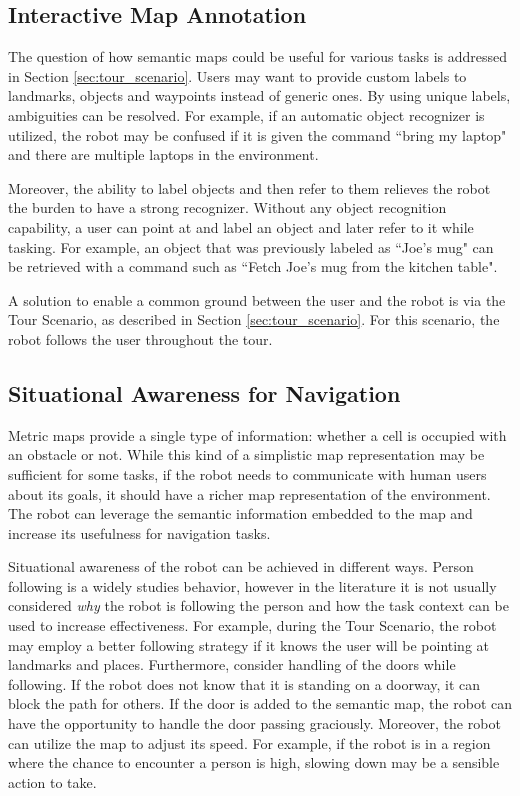 \documentclass[12pt]{gatech-thesis}
\begin{document}
\subsection{Interactive Map Annotation}

The question of how semantic maps could be useful for various tasks is addressed in Section \ref{sec:tour_scenario}. Users may want to provide custom labels to landmarks, objects and waypoints instead of generic ones. By using unique labels, ambiguities can be resolved. For example, if an automatic object recognizer is utilized, the robot may be confused if it is given the command ``bring my laptop" and there are multiple laptops in the environment.

Moreover, the ability to label objects and then refer to them relieves the robot the burden to have a strong recognizer. Without any object recognition capability, a user can point at and label an object and later refer to it while tasking. For example, an object that was previously labeled as ``Joe's mug" can be retrieved with a command such as ``Fetch Joe's mug from the kitchen table".

A solution to enable a common ground between the user and the robot is via the Tour Scenario, as described in Section \ref{sec:tour_scenario}. For this scenario, the robot follows the user throughout the tour.

\subsection{Situational Awareness for Navigation}

Metric maps provide a single type of information: whether a cell is occupied with an obstacle or not. While this kind of a simplistic map representation may be sufficient for some tasks, if the robot needs to communicate with human users about its goals, it should have a richer map representation of the environment. The robot can leverage the semantic information embedded to the map and increase its usefulness for navigation tasks. %


Situational awareness of the robot can be achieved in different ways. Person following is a widely studies behavior, however in the literature it is not usually considered \textit{why} the robot is following the person and how the task context can be used to increase effectiveness. For example, during the Tour Scenario, the robot may employ a better following strategy if it knows the user will be pointing at landmarks and places. Furthermore, consider handling of the doors while following. If the robot does not know that it is standing on a doorway, it can block the path for others. If the door is added to the semantic map, the robot can have the opportunity to handle the door passing graciously. Moreover, the robot can utilize the map to adjust its speed. For example, if the robot is in a region where the chance to encounter a person is high, slowing down may be a sensible action to take.
\end{document}
